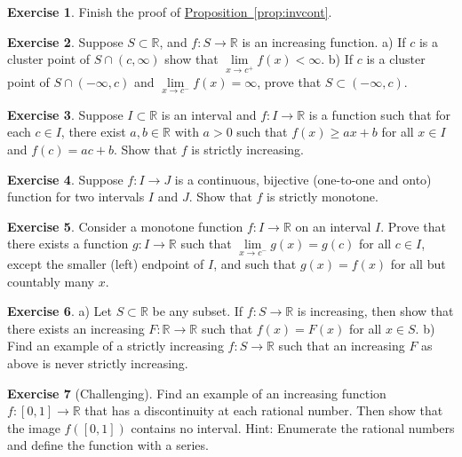 \documentclass[12pt]{book}
\newcommand{\R}{{\mathbb{R}}}
\theoremstyle{plain}
\theoremstyle{remark}
\theoremstyle{definition}
\theoremstyle{exercise}
\newtheorem{exercise}{Exercise}[section]
\theoremstyle{example}
\newcommand{\propref}[1]{\hyperref[#1]{Proposition~\ref*{#1}}}
\begin{document}
\begin{exercise}
Finish the proof of \propref{prop:invcont}.
\end{exercise}

\begin{exercise}
Suppose $S \subset \R$, and $f \colon S \to \R$ is an increasing
function.
a) If $c$ is a cluster point
of $S \cap (c,\infty)$ show that 
$\lim\limits_{x\to c^+} f(x) < \infty$.
b) If $c$ is a cluster point of $S \cap (-\infty,c)$
and $\lim\limits_{x\to c^-} f(x) = \infty$, prove that 
$S \subset (-\infty,c)$.
\end{exercise}

\begin{exercise}
Suppose $I \subset \R$ is an interval and $f \colon I \to \R$ is a function
such that for each $c \in I$, there exist $a, b \in \R$ with
$a > 0$ such that $f(x) \geq a x + b$ for all $x \in I$
and $f(c) = a c + b$.  Show that $f$ is strictly increasing.
\end{exercise}

\begin{exercise}
Suppose $f \colon I \to J$ is a continuous, bijective (one-to-one and onto)
function for two intervals $I$ and $J$.  Show that $f$ is strictly monotone.
\end{exercise}

\begin{exercise}
Consider a monotone function $f \colon I \to \R$ on an interval $I$.  Prove that there exists
a function $g \colon I \to \R$ such that
$\lim\limits_{x \to c^-} g(x) = g(c)$ for all $c \in I$, except the
smaller (left) endpoint of $I$, and such that
$g(x) = f(x)$ for all but countably many $x$.
\end{exercise}

\begin{exercise}
a) Let $S \subset \R$ be any subset.  If $f \colon S \to \R$ is increasing,
then show that there exists an increasing $F \colon \R \to \R$
such that $f(x) = F(x)$ for all $x \in S$.
b) Find an example of a strictly increasing $f \colon S \to \R$ such that
an increasing $F$ as above is never strictly increasing.
\end{exercise}

\begin{exercise}[Challenging] \label{exercise:increasingfuncdiscatQ}
Find an example of an increasing function $f \colon [0,1] \to \R$
that has a discontinuity at each rational number.  Then show that the image
$f([0,1])$ contains no interval.  Hint: Enumerate
the rational numbers and define
the function with a series.
\end{exercise}
\end{document}
